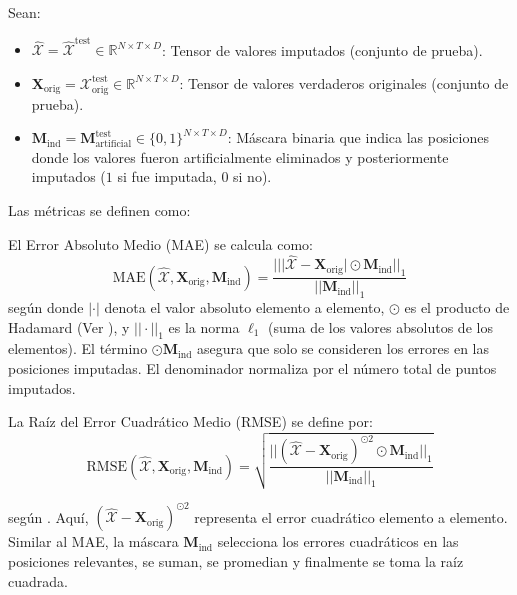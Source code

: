 Sean:
\begin{itemize}
    \item $\hat{\mathcal{X}} = \hat{\mathcal{X}}^{\text{test}} \in \mathbb{R}^{N \times T \times D}$: Tensor de valores imputados (conjunto de prueba).
    \item $\mathbf{X}_{\text{orig}} = \mathcal{X}_{\text{orig}}^{\text{test}} \in \mathbb{R}^{N \times T \times D}$: Tensor de valores verdaderos originales (conjunto de prueba).
    \item $\mathbf{M}_{\text{ind}} = \mathbf{M}_{\text{artificial}}^{\text{test}} \in \{0, 1\}^{N \times T \times D}$: Máscara binaria que indica las posiciones donde los valores fueron artificialmente eliminados y posteriormente imputados ($1$ si fue imputada, $0$ si no).
\end{itemize}

Las métricas se definen como:

\begin{definition}
\label{def:mae_hadamard}
El Error Absoluto Medio (MAE) se calcula como:
\begin{equation}
\text{MAE}(\hat{\mathcal{X}}, \mathbf{X}_{\text{orig}}, \mathbf{M}_{\text{ind}}) = \frac{||\lvert \hat{\mathcal{X}} - \mathbf{X}_{\text{orig}} \rvert \odot \mathbf{M}_{\text{ind}}||_1}{||\mathbf{M}_{\text{ind}}||_1}
\label{eq:mae_hadamard}
\end{equation}
según \citep{Willmott2005} donde $\lvert \cdot \rvert$ denota el valor absoluto elemento a elemento, $\odot$ es el producto de Hadamard (Ver ), y $||\cdot||_1$ es la norma $\ell_1$ (suma de los valores absolutos de los elementos). El término $\odot \mathbf{M}_{\text{ind}}$ asegura que solo se consideren los errores en las posiciones imputadas. El denominador normaliza por el número total de puntos imputados.
\end{definition}


\begin{definition}
\label{def:rmse_hadamard}
La Raíz del Error Cuadrático Medio (RMSE) se define por:
\begin{equation}
\text{RMSE}(\hat{\mathcal{X}}, \mathbf{X}_{\text{orig}}, \mathbf{M}_{\text{ind}}) = \sqrt{\frac{||(\hat{\mathcal{X}} - \mathbf{X}_{\text{orig}})^{\odot 2} \odot \mathbf{M}_{\text{ind}}||_1}{||\mathbf{M}_{\text{ind}}||_1}}
\label{eq:rmse_hadamard}
\end{equation}

según \citep{Chai2014}. 
Aquí, $(\hat{\mathcal{X}} - \mathbf{X}_{\text{orig}})^{\odot 2}$ representa el error cuadrático elemento a elemento. Similar al MAE, la máscara $\mathbf{M}_{\text{ind}}$ selecciona los errores cuadráticos en las posiciones relevantes, se suman, se promedian y finalmente se toma la raíz cuadrada.
\end{definition}

